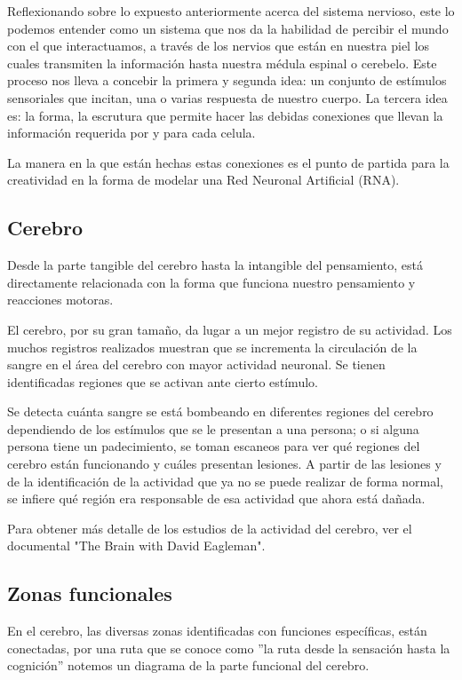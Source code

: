 Reflexionando sobre lo expuesto anteriormente acerca del sistema nervioso,
este lo podemos entender como un sistema que nos da la habilidad de percibir el mundo con el que interactuamos, a través de los nervios que están en nuestra piel los cuales transmiten la información hasta nuestra médula espinal o cerebelo. Este proceso nos lleva a concebir la primera y segunda idea: un conjunto de estímulos sensoriales que incitan, una o varias respuesta de nuestro cuerpo. La tercera idea es: la forma, la escrutura que permite hacer las debidas conexiones que llevan la información requerida por y para cada celula.

La manera en la que están hechas estas conexiones es el punto de partida para la creatividad en la forma de modelar una Red Neuronal Artificial (RNA).

\subsection{Cerebro}

Desde la parte tangible del cerebro hasta la intangible del pensamiento, está directamente relacionada con la forma que funciona nuestro pensamiento y reacciones motoras.


El cerebro, por su gran tamaño, da lugar a un mejor registro de su actividad. Los muchos registros realizados muestran que se incrementa la circulación de la sangre en el área del cerebro con mayor actividad neuronal. Se tienen identificadas regiones que se activan ante cierto estímulo. \parencite{neurona_A_cerebro}


 Se detecta cuánta sangre se está bombeando en diferentes regiones del cerebro dependiendo de los estímulos que se le presentan a una persona; o si alguna persona tiene un padecimiento, se toman escaneos para ver qué regiones del cerebro están funcionando y cuáles presentan lesiones. A partir de las lesiones y de la identificación de la actividad que ya no se puede realizar de forma normal, se infiere qué región era responsable de esa actividad que ahora está dañada.\parencite{estudiosF}

Para obtener más detalle de los estudios de la actividad del cerebro, ver el documental "The Brain with David Eagleman".

\subsection{Zonas funcionales}

En el cerebro, las diversas zonas identificadas con funciones específicas, están conectadas, por una ruta que se conoce como 
 ''la ruta desde la sensación hasta la cognición'' notemos un diagrama de la parte funcional del cerebro. \parencite{sensAcogn}
 


